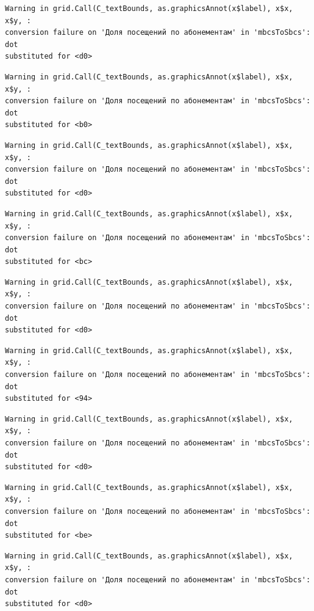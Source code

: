 \documentclass[
  letterpaper,
  DIV=11,
  numbers=noendperiod]{scrartcl}
\begin{document}
\begin{verbatim}
Warning in grid.Call(C_textBounds, as.graphicsAnnot(x$label), x$x, x$y, :
conversion failure on 'Доля посещений по абонементам' in 'mbcsToSbcs': dot
substituted for <d0>
\end{verbatim}

\begin{verbatim}
Warning in grid.Call(C_textBounds, as.graphicsAnnot(x$label), x$x, x$y, :
conversion failure on 'Доля посещений по абонементам' in 'mbcsToSbcs': dot
substituted for <b0>
\end{verbatim}

\begin{verbatim}
Warning in grid.Call(C_textBounds, as.graphicsAnnot(x$label), x$x, x$y, :
conversion failure on 'Доля посещений по абонементам' in 'mbcsToSbcs': dot
substituted for <d0>
\end{verbatim}

\begin{verbatim}
Warning in grid.Call(C_textBounds, as.graphicsAnnot(x$label), x$x, x$y, :
conversion failure on 'Доля посещений по абонементам' in 'mbcsToSbcs': dot
substituted for <bc>
\end{verbatim}

\begin{verbatim}
Warning in grid.Call(C_textBounds, as.graphicsAnnot(x$label), x$x, x$y, :
conversion failure on 'Доля посещений по абонементам' in 'mbcsToSbcs': dot
substituted for <d0>
\end{verbatim}

\begin{verbatim}
Warning in grid.Call(C_textBounds, as.graphicsAnnot(x$label), x$x, x$y, :
conversion failure on 'Доля посещений по абонементам' in 'mbcsToSbcs': dot
substituted for <94>
\end{verbatim}

\begin{verbatim}
Warning in grid.Call(C_textBounds, as.graphicsAnnot(x$label), x$x, x$y, :
conversion failure on 'Доля посещений по абонементам' in 'mbcsToSbcs': dot
substituted for <d0>
\end{verbatim}

\begin{verbatim}
Warning in grid.Call(C_textBounds, as.graphicsAnnot(x$label), x$x, x$y, :
conversion failure on 'Доля посещений по абонементам' in 'mbcsToSbcs': dot
substituted for <be>
\end{verbatim}

\begin{verbatim}
Warning in grid.Call(C_textBounds, as.graphicsAnnot(x$label), x$x, x$y, :
conversion failure on 'Доля посещений по абонементам' in 'mbcsToSbcs': dot
substituted for <d0>
\end{verbatim}
\end{document}
